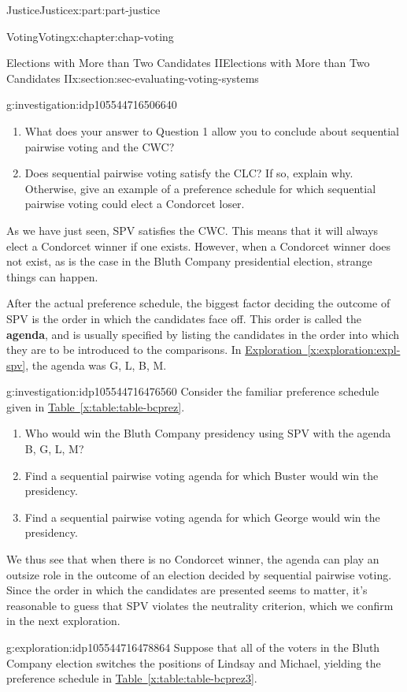 \documentclass[oneside,10pt,]{book}
\newcommand{\xreffont}{\relax}
\newcommand{\terminology}[1]{\textbf{#1}}
\numberwithin{equation}{section}
\begin{document}
\begin{partptx}{Justice}{}{Justice}{}{}{x:part:part-justice}
\begin{chapterptx}{Voting}{}{Voting}{}{}{x:chapter:chap-voting}
\begin{sectionptx}{Elections with More than Two Candidates II}{}{Elections with More than Two Candidates II}{}{}{x:section:sec-evaluating-voting-systems}
\begin{investigation}{}{g:investigation:idp105544716506640}
\begin{enumerate}
\item{}What does your answer to Question 1 allow you to conclude about sequential pairwise voting and the CWC?%
\item{}Does sequential pairwise voting satisfy the CLC? If so, explain why. Otherwise, give an example of a preference schedule for which sequential pairwise voting could elect a Condorcet loser.%
\end{enumerate}
\end{investigation}%
As we have just seen, SPV satisfies the CWC. This means that it will always elect a Condorcet winner if one exists. However, when a Condorcet winner does not exist, as is the case in the Bluth Company presidential election, strange things can happen.%
\par
After the actual preference schedule, the biggest factor deciding the outcome of SPV is the order in which the candidates face off. This order is called the \terminology{agenda}, and is usually specified by listing the candidates in the order into which they are to be introduced to the comparisons. In \hyperref[x:exploration:expl-spv]{Exploration~{\xreffont\ref{x:exploration:expl-spv}}}, the agenda was G, L, B, M.%
\begin{investigation}{}{g:investigation:idp105544716476560}%
Consider the familiar preference schedule given in \hyperref[x:table:table-bcprez]{Table~{\xreffont\ref{x:table:table-bcprez}}}.%
%
\begin{enumerate}
\item{}Who would win the Bluth Company presidency using SPV with the agenda B, G, L, M?%
\item{}Find a sequential pairwise voting agenda for which Buster would win the presidency.%
\item{}Find a sequential pairwise voting agenda for which George would win the presidency.%
\end{enumerate}
\end{investigation}%
We thus see that when there is no Condorcet winner, the agenda can play an outsize role in the outcome of an election decided by sequential pairwise voting. Since the order in which the candidates are presented seems to matter, it's reasonable to guess that SPV violates the neutrality criterion, which we confirm in the next exploration.%
\begin{exploration}{}{g:exploration:idp105544716478864}%
Suppose that all of the voters in the Bluth Company election switches the positions of Lindsay and Michael, yielding the preference schedule in \hyperref[x:table:table-bcprez3]{Table~{\xreffont\ref{x:table:table-bcprez3}}}.%

\end{exploration}
\end{sectionptx}
\end{chapterptx}
\end{partptx}
\end{document}

